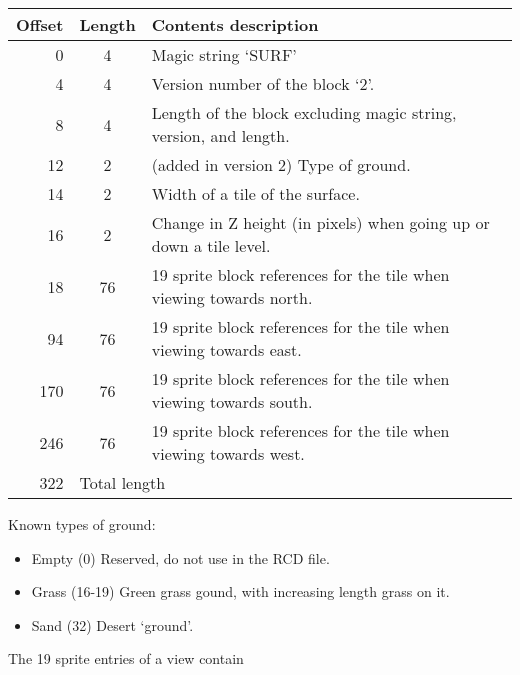 \documentclass{article}
\begin{document}
\begin{center}
\begin{tabular}{|r|c|l|} \hline
\textbf{Offset} & \textbf{Length} & \textbf{Contents description} \\ \hline
  0 & 4 & Magic string `SURF' \\
  4 & 4 & Version number of the block `2'. \\
  8 & 4 & Length of the block excluding magic string, version, and length. \\
 12 & 2 & (added in version 2) Type of ground. \\
 14 & 2 & Width of a tile of the surface. \\
 16 & 2 & Change in Z height (in pixels) when going up or down a tile level. \\
 18 & 76 & 19 sprite block references for the tile when viewing towards north. \\
 94 & 76 & 19 sprite block references for the tile when viewing towards east.  \\
170 & 76 & 19 sprite block references for the tile when viewing towards south. \\
246 & 76 & 19 sprite block references for the tile when viewing towards west.  \\ \hline
322 & \multicolumn{2}{l|}{Total length} \\ \hline
\end{tabular}
\end{center}

Known types of ground:
\begin{itemize}
\item Empty (0) Reserved, do not use in the RCD{} file.
\item Grass (16-19) Green grass gound, with increasing length grass on it.
\item Sand  (32) Desert `ground'.
\end{itemize}

The 19 sprite entries of a view contain
\end{document}
